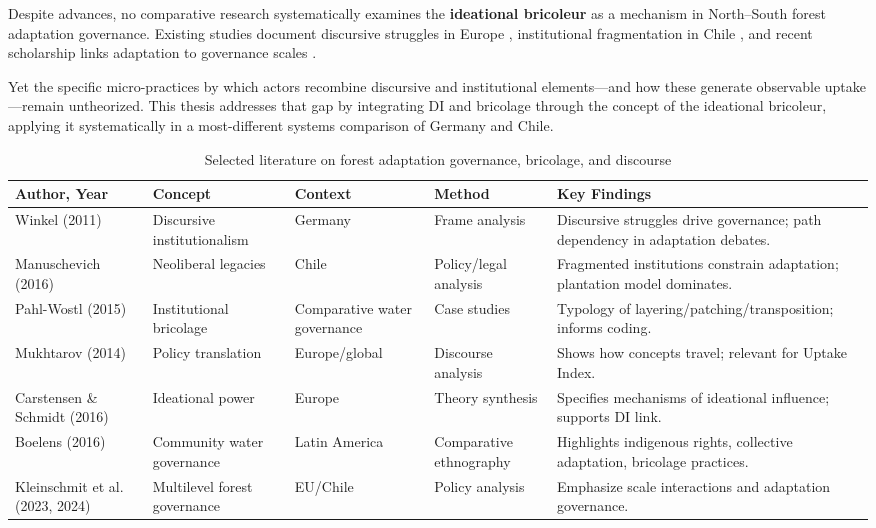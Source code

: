 Despite advances, no comparative research systematically examines the 
\textbf{ideational bricoleur} as a mechanism in North–South forest adaptation governance.  
Existing studies document discursive struggles in Europe \parencite{Winkel2011}, 
institutional fragmentation in Chile \parencite{Manuschevich2016}, and recent 
scholarship links adaptation to governance scales 
\parencite{Kleinschmit2024,KleinschmitChiassonPulzl2023}.  

Yet the specific micro-practices by which actors recombine discursive and 
institutional elements—and how these generate observable uptake—remain untheorized.  
This thesis addresses that gap by integrating DI and bricolage through the concept 
of the ideational bricoleur, applying it systematically in a most-different systems 
comparison of Germany and Chile.

\begin{table}[h!]
\centering
\tiny
\caption{Selected literature on forest adaptation governance, bricolage, and discourse}
\label{tab:litreview}
\begin{tabular}{@{}p{2.5cm}p{2.5cm}p{3cm}p{4cm}p{4.5cm}@{}}
\toprule
\textbf{Author, Year} & \textbf{Concept} & \textbf{Context} & \textbf{Method} & \textbf{Key Findings} \\ \midrule
Winkel (2011) & Discursive institutionalism & Germany & Frame analysis & Discursive struggles drive governance; path dependency in adaptation debates. \\
Manuschevich (2016) & Neoliberal legacies & Chile & Policy/legal analysis & Fragmented institutions constrain adaptation; plantation model dominates. \\
Pahl-Wostl (2015) & Institutional bricolage & Comparative water governance & Case studies & Typology of layering/patching/transposition; informs coding. \\
Mukhtarov (2014) & Policy translation & Europe/global & Discourse analysis & Shows how concepts travel; relevant for Uptake Index. \\
Carstensen \& Schmidt (2016) & Ideational power & Europe & Theory synthesis & Specifies mechanisms of ideational influence; supports DI link. \\
Boelens (2016) & Community water governance & Latin America & Comparative ethnography & Highlights indigenous rights, collective adaptation, bricolage practices. \\
Kleinschmit et al. (2023, 2024) & Multilevel forest governance & EU/Chile & Policy analysis & Emphasize scale interactions and adaptation governance. \\
\bottomrule
\end{tabular}
\end{table}